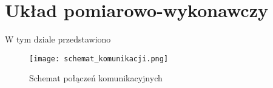 \section{Układ pomiarowo-wykonawczy}
W tym dziale przedstawiono 
\begin{figure}[H]
	\centering
	\texttt{[image: schemat\_komunikacji.png]}
	\caption{Schemat połączeń komunikacyjnych}
\end{figure}



